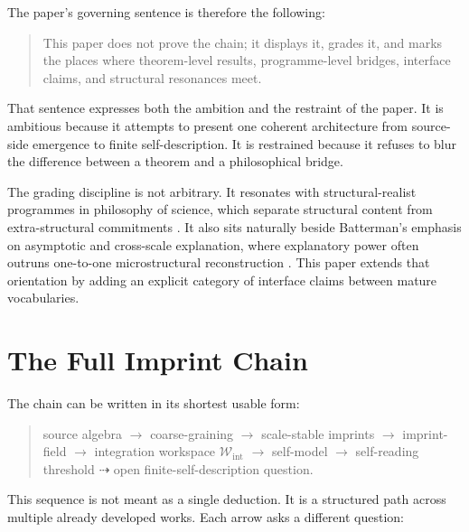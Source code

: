 \documentclass[12pt,a4paper]{article}
\begin{document}
The paper's governing sentence is therefore the following:

\begin{quote}
This paper does not prove the chain; it displays it, grades it, and marks the places where theorem-level results, programme-level bridges, interface claims, and structural resonances meet.
\end{quote}

That sentence expresses both the ambition and the restraint of the paper. It is ambitious because it attempts to present one coherent architecture from source-side emergence to finite self-description. It is restrained because it refuses to blur the difference between a theorem and a philosophical bridge.

The grading discipline is not arbitrary. It resonates with structural-realist programmes in philosophy of science, which separate structural content from extra-structural commitments \cite{Ladyman2007,French2014}. It also sits naturally beside Batterman's emphasis on asymptotic and cross-scale explanation, where explanatory power often outruns one-to-one microstructural reconstruction \cite{Batterman2002}. This paper extends that orientation by adding an explicit category of interface claims between mature vocabularies.

\section{The Full Imprint Chain}

The chain can be written in its shortest usable form:

\begin{quote}
source algebra $\to$ coarse-graining $\to$ scale-stable imprints $\to$
imprint-field $\to$ integration workspace \(\mathcal W_{\mathrm{int}}\)
$\to$ self-model $\to$ self-reading threshold $\dashrightarrow$
open finite-self-description question.
\end{quote}

This sequence is not meant as a single deduction. It is a structured path across multiple already developed works. Each arrow asks a different question:
\end{document}
